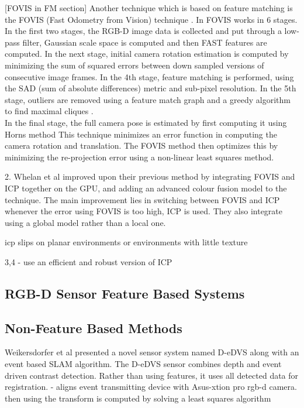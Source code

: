 [FOVIS in FM section]
Another technique which is based on feature matching is the FOVIS (Fast Odometry from Vision) technique \cite{Huang17Visual}. In FOVIS works in 6 stages. In the first two stages, the RGB-D image data is collected and put through a low-pass filter, Gaussian scale space is computed and then FAST features \cite{Rosten06Machine,Rosten05Fusing} are computed. In the next stage, initial camera rotation estimation is computed by minimizing the sum of squared errors between down sampled versions of consecutive image frames. In the 4th stage, feature matching is performed, using the SAD (sum of absolute differences) metric and sub-pixel resolution. In the 5th stage, outliers are removed using a feature match graph and a greedy algorithm to find maximal cliques \cite{Hirschmuller02Fast,Howard08Real}. \\

In the final stage, the full camera pose is estimated by first computing it using Horns method \cite{Horn87Closed} This technique minimizes an error function in computing the camera rotation and translation. The FOVIS method then optimizes this by minimizing the re-projection error using a non-linear least squares method.

2.  
Whelan et al improved \cite{Whelan13Robust} upon their previous method \cite{Whelan12Kintinous} by integrating FOVIS and ICP together on the GPU, and adding an advanced colour fusion model to the technique. The main improvement lies in switching between FOVIS and ICP whenever the error using FOVIS is too high, ICP is used. They also integrate using a global model rather than a local one. 


icp slips on planar environments or environments with little texture \cite{Whelan13Robust}

3,4
\cite{Stuckler12Robust} - use an efficient and robust version of ICP


\subsection{RGB-D Sensor Feature Based Systems}




\subsection{Non-Feature Based Methods}


Weikersdorfer et al \cite{Weikersdorfer14Event} presented a novel sensor system named D-eDVS along with an event based SLAM algorithm. The D-eDVS sensor combines depth and event driven contrast detection. Rather than using features, it uses all detected data for registration. - aligns event transmitting device with Asus-xtion pro rgb-d camera. then using the transform is computed by solving a least squares algorithm

